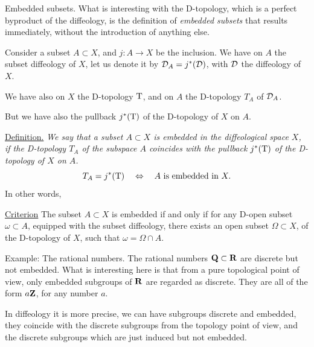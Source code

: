 \begin{Article}{Embedded subsets.}{}
  What is interesting with the D-topology,
  which is a perfect byproduct of the diffeology,
  is the definition of \emph{embedded subsets} that results immediately,
  without the introduction of anything else.

  Consider a subset $A \subset X$,
  and $j \colon A \to X$ be the inclusion.
  We have on $A$ the subset diffeology of $X$,
  let us denote it by $\mathcal{D}_A = j^*(\mathcal{D})$,
  with $\mathcal{D}$ the diffeology of $X$.

  We have also on $X$ the D-topology $\mathrm{T}$,
  and on $A$ the D-topology $T_A$ of $\mathcal{D}_A$.

  But we have also the pullback $j^*(\mathrm{T})$ of the D-topology of $X$ on $A$.

  \uline{Definition.} {\itshape We say that a subset $A \subset X$ is embedded in the diffeological space $X$,
  if the D-topology $T_A$ of the subspace $A$ coincides with the pullback $j^*(\mathrm{T})$ of the D-topology of $X$ on $A$.
  $$%
    T_A = j^*(\Torus) \quad \Leftrightarrow \quad A \text{ is embedded in } X.
  $$%
  }
  In other words,

  \uline{Criterion} The subset $A \subset X$ is embedded if and only if for any D-open subset $\omega \subset A$,
  equipped with the subset diffeology,
  there exists an open subset $\Omega \subset X$,
  of the D-topology of $X$,
  such that $\omega = \Omega \cap A$.
\end{Article}

\begin{Article}{Example: The rational numbers.}{}
  The rational numbers $\mathbf{Q} \subset \mathbf{R}$ are discrete but not embedded.
  What is interesting here is that from a pure topological point of view, only embedded subgroups of $\mathbf{R}$ are regarded as discrete.
  They are all of the form $a\mathbf{Z}$,
  for any number $a$.

  In diffeology it is more precise,
  we can have subgroups discrete and embedded,
  they coincide with the discrete subgroups from the topology point of view,
  and the discrete subgroups which are just induced but not embedded.
\end{Article}

